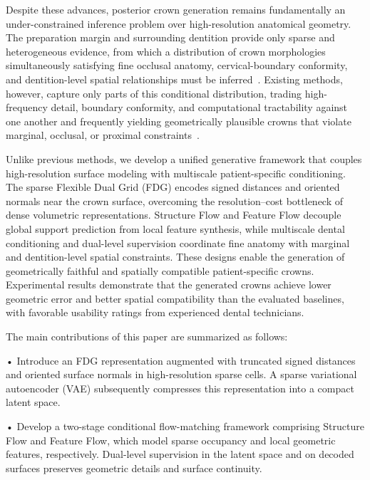 \documentclass[preprint,review,12pt]{elsarticle}
\begin{document}
\hspace{2em}Despite these advances, posterior crown generation remains fundamentally an under-constrained inference problem over high-resolution anatomical geometry. The preparation margin and surrounding dentition provide only sparse and heterogeneous evidence, from which a distribution of crown morphologies simultaneously satisfying fine occlusal anatomy, cervical-boundary conformity, and dentition-level spatial relationships must be inferred~\cite{Ye2027CrownFusion}. Existing methods, however, capture only parts of this conditional distribution, trading high-frequency detail, boundary conformity, and computational tractability against one another and frequently yielding geometrically plausible crowns that violate marginal, occlusal, or proximal constraints~\cite{Tian2022DentalRecNet,Yang2025DCrownFormerPlus,Wei2025VBCD,Wei2026MADCrowner}.

\hspace{2em}Unlike previous methods, we develop a unified generative framework that couples high-resolution surface modeling with multiscale patient-specific conditioning. The sparse Flexible Dual Grid (FDG) encodes signed distances and oriented normals near the crown surface, overcoming the resolution--cost bottleneck of dense volumetric representations. Structure Flow and Feature Flow decouple global support prediction from local feature synthesis, while multiscale dental conditioning and dual-level supervision coordinate fine anatomy with marginal and dentition-level spatial constraints. These designs enable the generation of geometrically faithful and spatially compatible patient-specific crowns. Experimental results demonstrate that the generated crowns achieve lower geometric error and better spatial compatibility than the evaluated baselines, with favorable usability ratings from experienced dental technicians.

\hspace{2em}The main contributions of this paper are summarized as follows:

\hspace{1em}• Introduce an FDG representation augmented with truncated signed distances and oriented surface normals in high-resolution sparse cells. A sparse variational autoencoder (VAE) subsequently compresses this representation into a compact latent space.

\hspace{1em}• Develop a two-stage conditional flow-matching framework comprising Structure Flow and Feature Flow, which model sparse occupancy and local geometric features, respectively. Dual-level supervision in the latent space and on decoded surfaces preserves geometric details and surface continuity.
\end{document}
